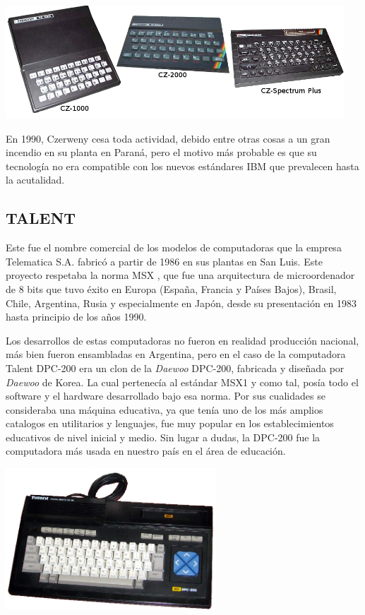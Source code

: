 \documentclass[%
 	final,
%
	notitlepage,
	narroweqnarray,
	inline,
 	twoside,
	]{ieee}
\begin{document}
\begin{center}\includegraphics[width=360pt, height=120pt]{serieCZ.png}\end{center}

En 1990, Czerweny cesa toda actividad, debido entre otras cosas a un gran incendio en su planta en Paran\'a, pero el motivo m\'as probable es que su tecnolog\'ia no era compatible con los nuevos est\'andares IBM que prevalecen hasta la acutalidad.

\subsection*{TALENT}

Este fue el nombre comercial de los modelos de computadoras que la empresa Telematica S.A. fabric\'o a partir de 1986 en sus plantas en San Luis. Este proyecto respetaba la norma MSX \cite{msx}, que fue una arquitectura de microordenador de 8 bits que tuvo \'exito en Europa (Espa\~na, Francia y Pa\'ises Bajos), Brasil, Chile, Argentina, Rusia y especialmente en Jap\'on, desde su presentaci\'on en 1983 hasta principio de los a\~nos 1990.

Los desarrollos de estas computadoras no fueron en realidad producci\'on nacional, m\'as bien fueron ensambladas en Argentina, pero en el caso de la computadora Talent DPC-200 era un clon de la \textit{Daewoo} DPC-200, fabricada y dise\~nada por \textit{Daewoo} de Korea. La cual pertenec\'ia al est\'andar MSX1 y como tal, pos\'ia todo el software y el hardware desarrollado bajo esa norma.
Por sus cualidades se consideraba una m\'aquina educativa, ya que ten\'ia uno de los m\'as amplios catalogos en utilitarios y lenguajes, fue muy popular en los establecimientos educativos de nivel inicial y medio. Sin lugar a dudas, la DPC-200 fue la computadora m\'as usada en nuestro pa\'is en el \'area de educaci\'on.

\begin{center}\includegraphics[width=224pt, height=150pt]{talent.png}\end{center}
\end{document}
